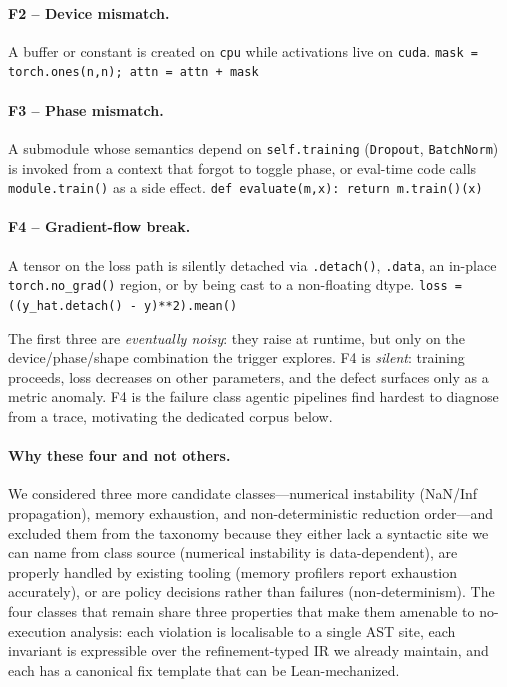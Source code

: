 \documentclass{article}
\begin{document}
\paragraph{F2 -- Device mismatch.} A buffer or constant is created on
\texttt{cpu} while activations live on \texttt{cuda}.
{\small\verb|mask = torch.ones(n,n); attn = attn + mask|}

\paragraph{F3 -- Phase mismatch.} A submodule whose semantics depend on
\texttt{self.training} (\texttt{Dropout}, \texttt{BatchNorm}) is invoked from
a context that forgot to toggle phase, or eval-time code calls
\texttt{module.train()} as a side effect.
{\small\verb|def evaluate(m,x): return m.train()(x)|}

\paragraph{F4 -- Gradient-flow break.} A tensor on the loss path is silently
detached via \texttt{.detach()}, \texttt{.data}, an in-place
\texttt{torch.no\_grad()} region, or by being cast to a non-floating dtype.
{\small\verb|loss = ((y_hat.detach() - y)**2).mean()|}

The first three are \emph{eventually noisy}: they raise at runtime, but only
on the device/phase/shape combination the trigger explores. F4 is
\emph{silent}: training proceeds, loss decreases on other parameters, and the
defect surfaces only as a metric anomaly. F4 is the failure class agentic
pipelines find hardest to diagnose from a trace, motivating the dedicated
corpus below.

\paragraph{Why these four and not others.}
We considered three more candidate classes---numerical instability
(NaN/Inf propagation), memory exhaustion, and non-deterministic
reduction order---and excluded them from the taxonomy because they
either lack a syntactic site we can name from class source
(numerical instability is data-dependent), are properly handled by
existing tooling (memory profilers report exhaustion accurately), or
are policy decisions rather than failures (non-determinism). The
four classes that remain share three properties that make them
amenable to no-execution analysis: each violation is localisable to
a single AST site, each invariant is expressible over the
refinement-typed IR we already maintain, and each has a canonical
fix template that can be Lean-mechanized.
\end{document}
